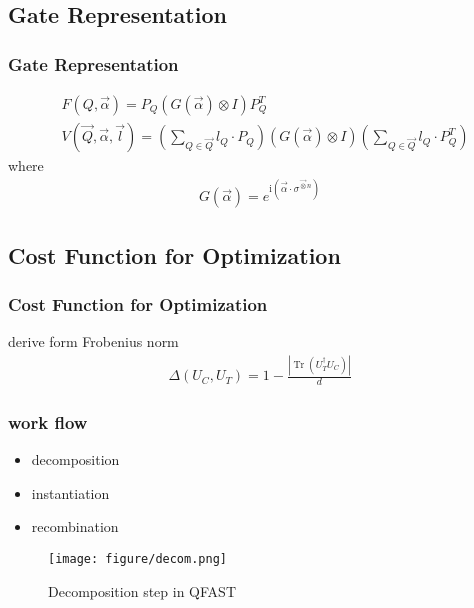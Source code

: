 \subsection{Gate Representation}
\begin{frame}
\frametitle{Gate Representation}

\begin{align}
  &F(Q, \vec{\alpha})=P_{Q}(G(\vec{\alpha}) \otimes I) P_{Q}^{T}\\
  &V(\vec{Q}, \vec{\alpha}, \vec{l})=\left(\sum_{Q \in \vec{Q}} l_{Q} \cdot P_{Q}\right)(G(\vec{\alpha}) \otimes I)\left(\sum_{Q \in \vec{Q}} l_{Q} \cdot P_{Q}^{T}\right)
\end{align}
where
\begin{align}
  G(\vec{\alpha})=e^{\mathrm{i}\left(\vec{\alpha} \cdot \sigma^{\vec{\otimes} n}\right)}
\end{align}
\end{frame}

\subsection{Cost Function for Optimization}

\begin{frame}
\frametitle{Cost Function for Optimization}
derive form Frobenius norm
\begin{align}
  \Delta\left(U_{C}, U_{T}\right)=1-\frac{\left|\operatorname{Tr}\left(U_{T}^{\dagger} U_{C}\right)\right|}{d}
\end{align}
\end{frame}

\begin{frame}
  \frametitle{work flow}
  \begin{itemize}
    \item decomposition
    \item instantiation
    \item recombination
  \end{itemize}
  \begin{figure}
    \texttt{[image: figure/decom.png]}
    \caption{Decomposition step in QFAST}
  \end{figure}
\end{frame}

